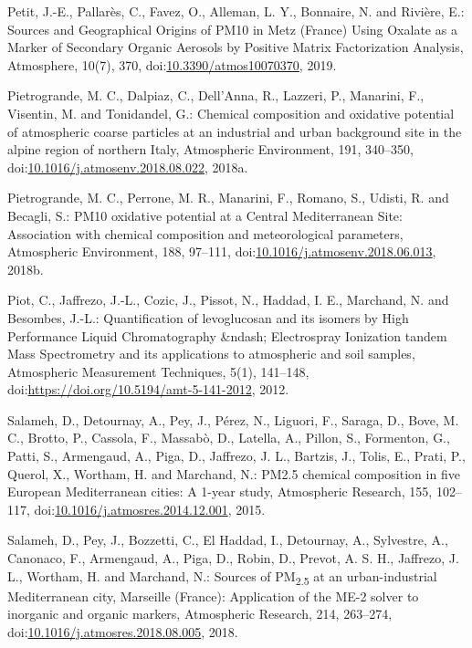 \documentclass[
]{article}
\begin{document}
Petit, J.-E., Pallarès, C., Favez, O., Alleman, L. Y., Bonnaire, N. and
Rivière, E.: Sources and Geographical Origins of PM10 in Metz (France)
Using Oxalate as a Marker of Secondary Organic Aerosols by Positive
Matrix Factorization Analysis, Atmosphere, 10(7), 370,
doi:\href{https://doi.org/10.3390/atmos10070370}{10.3390/atmos10070370},
2019.

Pietrogrande, M. C., Dalpiaz, C., Dell'Anna, R., Lazzeri, P., Manarini,
F., Visentin, M. and Tonidandel, G.: Chemical composition and oxidative
potential of atmospheric coarse particles at an industrial and urban
background site in the alpine region of northern Italy, Atmospheric
Environment, 191, 340--350,
doi:\href{https://doi.org/10.1016/j.atmosenv.2018.08.022}{10.1016/j.atmosenv.2018.08.022},
2018a.

Pietrogrande, M. C., Perrone, M. R., Manarini, F., Romano, S., Udisti,
R. and Becagli, S.: PM10 oxidative potential at a Central Mediterranean
Site: Association with chemical composition and meteorological
parameters, Atmospheric Environment, 188, 97--111,
doi:\href{https://doi.org/10.1016/j.atmosenv.2018.06.013}{10.1016/j.atmosenv.2018.06.013},
2018b.

Piot, C., Jaffrezo, J.-L., Cozic, J., Pissot, N., Haddad, I. E.,
Marchand, N. and Besombes, J.-L.: Quantification of levoglucosan and its
isomers by High Performance Liquid Chromatography \&ndash; Electrospray
Ionization tandem Mass Spectrometry and its applications to atmospheric
and soil samples, Atmospheric Measurement Techniques, 5(1), 141--148,
doi:\href{https://doi.org/https://doi.org/10.5194/amt-5-141-2012}{https://doi.org/10.5194/amt-5-141-2012},
2012.

Salameh, D., Detournay, A., Pey, J., Pérez, N., Liguori, F., Saraga, D.,
Bove, M. C., Brotto, P., Cassola, F., Massabò, D., Latella, A., Pillon,
S., Formenton, G., Patti, S., Armengaud, A., Piga, D., Jaffrezo, J. L.,
Bartzis, J., Tolis, E., Prati, P., Querol, X., Wortham, H. and Marchand,
N.: PM2.5 chemical composition in five European Mediterranean cities: A
1-year study, Atmospheric Research, 155, 102--117,
doi:\href{https://doi.org/10.1016/j.atmosres.2014.12.001}{10.1016/j.atmosres.2014.12.001},
2015.

Salameh, D., Pey, J., Bozzetti, C., El Haddad, I., Detournay, A.,
Sylvestre, A., Canonaco, F., Armengaud, A., Piga, D., Robin, D., Prevot,
A. S. H., Jaffrezo, J. L., Wortham, H. and Marchand, N.: Sources of
PM\textsubscript{2.5} at an urban-industrial Mediterranean city,
Marseille (France): Application of the ME-2 solver to inorganic and
organic markers, Atmospheric Research, 214, 263--274,
doi:\href{https://doi.org/10.1016/j.atmosres.2018.08.005}{10.1016/j.atmosres.2018.08.005},
2018.
\end{document}
